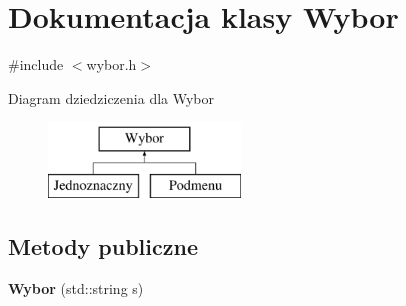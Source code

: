 \hypertarget{classWybor}{\section{Dokumentacja klasy Wybor}
\label{classWybor}
}


{\ttfamily \#include $<$wybor.\-h$>$}

Diagram dziedziczenia dla Wybor\begin{figure}[H]
\begin{center}
\leavevmode
\includegraphics[height=2.000000cm]{classWybor}
\end{center}
\end{figure}
\subsection*{Metody publiczne}
\begin{DoxyCompactItemize}
\item 
\hypertarget{classWybor_a3e0c715881bdeeec7bbcb84531e3b0e5}{{\bfseries Wybor} (std\-::string s)}\label{classWybor_a3e0c715881bdeeec7bbcb84531e3b0e5}

\end{DoxyCompactItemize}

